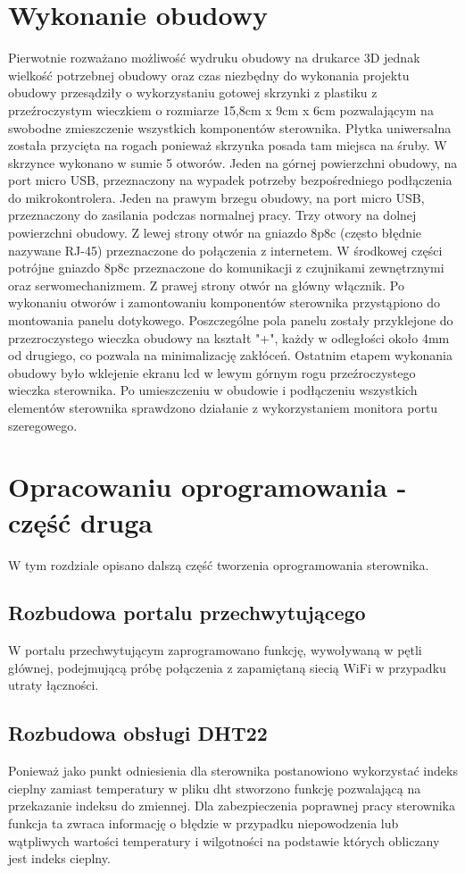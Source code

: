 \documentclass[11pt]{report}
\begin{document}
 \chapter{Wykonanie obudowy}\label{ch:obudowa}
 Pierwotnie rozważano możliwość wydruku obudowy na drukarce 3D \cite{Frence2014} jednak wielkość potrzebnej obudowy oraz czas niezbędny do wykonania projektu obudowy przesądziły o wykorzystaniu gotowej skrzynki z plastiku z przeźroczystym wieczkiem o rozmiarze 15,8cm x 9cm x 6cm pozwalającym na swobodne zmieszczenie wszystkich komponentów sterownika. Płytka uniwersalna została przycięta na rogach ponieważ skrzynka posada tam miejsca na śruby. W skrzynce wykonano w sumie 5 otworów. Jeden na górnej powierzchni obudowy, na port micro USB, przeznaczony na wypadek potrzeby bezpośredniego podłączenia do mikrokontrolera. Jeden na prawym brzegu obudowy, na port micro USB, przeznaczony do zasilania podczas normalnej pracy. Trzy otwory na dolnej powierzchni obudowy. Z lewej strony otwór na gniazdo 8p8c (często błędnie nazywane RJ-45) przeznaczone do połączenia z internetem. W środkowej części potrójne gniazdo 8p8c przeznaczone do komunikacji z czujnikami zewnętrznymi oraz serwomechanizmem. Z prawej strony otwór na główny włącznik.
 Po wykonaniu otworów i zamontowaniu komponentów sterownika przystąpiono do montowania panelu dotykowego. Poszczególne pola panelu zostały przyklejone do przezroczystego wieczka obudowy na kształt "+", każdy w odległości około 4mm od drugiego, co pozwala na minimalizację zakłóceń.
 Ostatnim etapem wykonania obudowy było wklejenie ekranu lcd w lewym górnym rogu przeźroczystego wieczka sterownika.
 Po umieszczeniu w obudowie i podłączeniu wszystkich elementów sterownika sprawdzono działanie z wykorzystaniem monitora portu szeregowego.
 
 \chapter{Opracowaniu oprogramowania - część druga}\label{ch:oprog:2}
 W tym rozdziale opisano dalszą część tworzenia oprogramowania sterownika. 

  \section{Rozbudowa portalu przechwytującego}
  W portalu przechwytującym zaprogramowano funkcję, wywoływaną w pętli głównej, podejmującą próbę połączenia z zapamiętaną siecią WiFi w przypadku utraty łączności.
  
 \section{Rozbudowa obsługi DHT22}
 Ponieważ jako punkt odniesienia dla sterownika postanowiono wykorzystać indeks cieplny zamiast temperatury w pliku dht stworzono funkcję pozwalającą na przekazanie indeksu do zmiennej. Dla zabezpieczenia poprawnej pracy sterownika funkcja ta zwraca informację o błędzie w przypadku niepowodzenia lub wątpliwych wartości temperatury i wilgotności na podstawie których obliczany jest indeks cieplny. 
\end{document}
